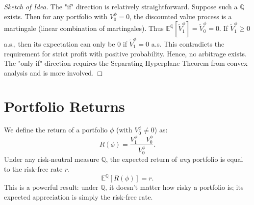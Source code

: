 \begin{proof}[Sketch of Idea]
The "if" direction is relatively straightforward. Suppose such a $\mathbb{Q}$ exists. Then for any portfolio with $V_0^\phi = 0$, the discounted value process is a martingale (linear combination of martingales).
Thus $\mathbb{E}^\mathbb{Q}[\tilde{V}_1^\phi] = \tilde{V}_0^\phi = 0$.
If $\tilde{V}_1^\phi \ge 0$ a.s., then its expectation can only be 0 if $\tilde{V}_1^\phi = 0$ a.s. This contradicts the requirement for strict profit with positive probability. Hence, no arbitrage exists.
The "only if" direction requires the Separating Hyperplane Theorem from convex analysis and is more involved.
\end{proof}

\section{Portfolio Returns}

We define the return of a portfolio $\phi$ (with $V_0^\phi \ne 0$) as:
\begin{equation}
    R(\phi) = \frac{V_1^\phi - V_0^\phi}{V_0^\phi}.
\end{equation}
Under any risk-neutral measure $\mathbb{Q}$, the expected return of \textit{any} portfolio is equal to the risk-free rate $r$.
\begin{equation}
    \mathbb{E}^\mathbb{Q}[R(\phi)] = r.
\end{equation}
This is a powerful result: under $\mathbb{Q}$, it doesn't matter how risky a portfolio is; its expected appreciation is simply the risk-free rate.
